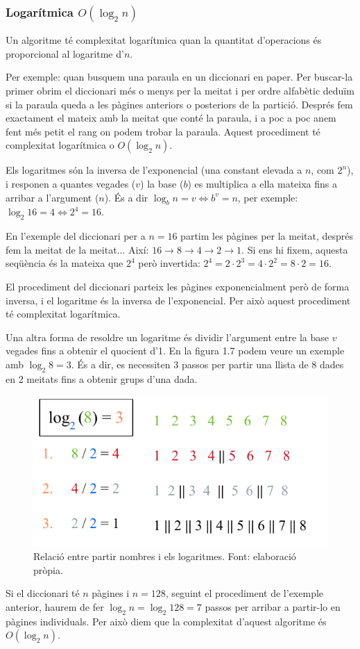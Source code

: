 \subsubsection*{Logarítmica $O(\log_2{n})$}
Un algoritme té complexitat logarítmica quan la quantitat d'operacions és proporcional al logaritme d'$n$.

Per exemple: quan busquem una paraula en un diccionari en paper. Per buscar-la primer obrim el diccionari més o menys per la meitat i per ordre alfabètic deduïm si la paraula queda a les pàgines anteriors o posteriors de la partició. Després fem exactament el mateix amb la meitat que conté la paraula, i a poc a poc anem fent més petit el rang on podem trobar la paraula. Aquest procediment té complexitat logarítmica o $O(\log_2{n})$.

Els logaritmes són la inversa de l'exponencial (una constant elevada a $n$, com $2^n$), i responen a quantes vegades ($v$) la base ($b$) es multiplica a ella mateixa fins a arribar a l'argument ($n$). És a dir $\log_b{n} = v \iff b^v = n$, per exemple: $\log_2{16} = 4 \iff 2^4 = 16$. 

En l'exemple del diccionari per a $n = 16$ partim les pàgines per la meitat, després fem la meitat de la meitat... Així: $16 \rightarrow 8 \rightarrow 4 \rightarrow 2 \rightarrow 1$. Si ens hi fixem, aquesta seqüència és la mateixa que $2^4$ però invertida: $2^4 = 2 \cdot 2^3 = 4 \cdot 2^2 = 8 \cdot 2 = 16$. 

El procediment del diccionari parteix les pàgines exponencialment però de forma inversa, i el logaritme és la inversa de l'exponencial. Per això aquest procediment té complexitat logarítmica.

Una altra forma de resoldre un logaritme és dividir l'argument entre la base $v$ vegades fins a obtenir el quocient d'1. En la figura 1.7 podem veure un exemple amb $\log_2{8} = 3$. És a dir, es necessiten 3 passos per partir una llista de 8 dades en 2 meitats fins a obtenir grups d'una dada.

\begin{figure}[H]
    \centering
    \includegraphics[width=.5\textwidth]{capitols/figures/log (4).pdf}
    \caption[Relació entre partir llistes i els logaritmes.]{Relació entre partir nombres i els logaritmes. Font: elaboració pròpia.}
    \label{fig:my_label}
\end{figure}
\vspace{-18pt}
Si el diccionari té $n$ pàgines i $n = 128$, seguint el procediment de l'exemple anterior, haurem de fer $\log_2{n} = \log_2{128} = 7$ passos per arribar a partir-lo en pàgines individuals.  Per això diem que la complexitat d'aquest algoritme és $O(\log_2{n})$.

